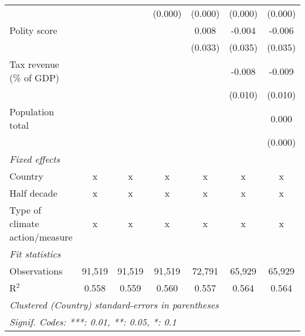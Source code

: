 \begin{tabular}{lcccccc}
                                                                               &               &                & (0.000)        & (0.000)        & (0.000)        & (0.000)\\   
   Polity score                                                                &               &                &                & 0.008          & -0.004         & -0.006\\   
                                                                               &               &                &                & (0.033)        & (0.035)        & (0.035)\\   
   Tax revenue (\% of GDP)                                                     &               &                &                &                & -0.008         & -0.009\\   
                                                                               &               &                &                &                & (0.010)        & (0.010)\\   
   Population total                                                            &               &                &                &                &                & 0.000\\   
                                                                               &               &                &                &                &                & (0.000)\\   
   \emph{Fixed effects}\\
   Country                                                                     & x             & x              & x              & x              & x              & x\\  
   Half decade                                                                 & x             & x              & x              & x              & x              & x\\  
   Type of climate action/measure                                              & x             & x              & x              & x              & x              & x\\  
   \midrule \emph{Fit statistics}\\
   Observations                                                                & 91,519        & 91,519         & 91,519         & 72,791         & 65,929         & 65,929\\  
   R$^2$                                                                       & 0.558         & 0.559          & 0.560          & 0.557          & 0.564          & 0.564\\  
   \midrule
   \multicolumn{7}{l}{\emph{Clustered (Country) standard-errors in parentheses}}\\
   \multicolumn{7}{l}{\emph{Signif. Codes: ***: 0.01, **: 0.05, *: 0.1}}\\
\end{tabular}
\par\endgroup


